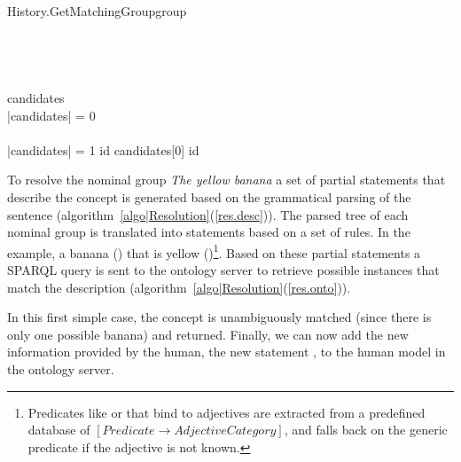 \small
\begin{pseudocode}[ruled]{History.GetMatchingGroup}{group}
\label{algo|History}
\\
 \GETS {}\\
 \\
 \\
	 \GETS {} \\ 
	
	candidates \GETS {} \cap {}\\
	\IF \left|{candidates}\right| = 0 \THEN
    \BEGIN
       \\
      \EXIT \\
    \END
   \ELSEIF \left|{candidates}\right| = 1 \THEN
      id \GETS candidates[0]
   \ELSE
   	  id \GETS {}\\
\ENDPROCEDURE
\end{pseudocode}
\normalsize

To resolve the nominal group \emph{The yellow banana} a set of partial
statements that describe the concept is generated based on the grammatical
parsing of the sentence (algorithm~\ref{algo|Resolution}(\ref{res.desc})). The
parsed tree of each nominal group is translated into statements based on a set
of rules.  In the example, a banana () that is yellow
()\footnote{Predicates like  or
 that bind  to adjectives are extracted
from a predefined database of $[Predicate \rightarrow AdjectiveCategory]$, and
falls back on the generic  predicate if the adjective is
not known.}.  Based on these partial statements a SPARQL query is sent to the
ontology server to retrieve possible instances that match the description
(algorithm~\ref{algo|Resolution}(\ref{res.onto})).

In this first simple case, the concept  is unambiguously
matched (since there is only one possible banana) and returned. Finally, we can
now add the new information provided by the human, \ie the new statement
, to the human model in the ontology server.

